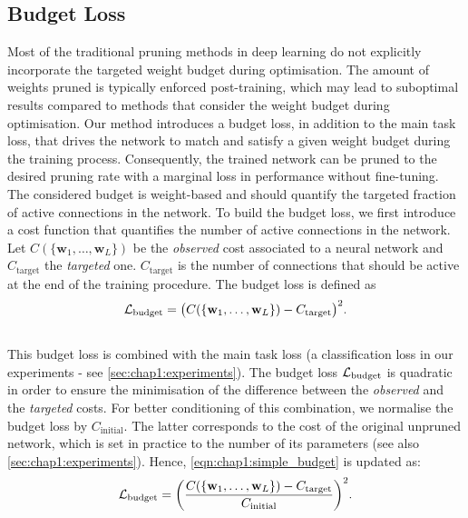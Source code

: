 \subsection{Budget Loss}
\label{sec:chap1:budget_loss}
Most of the traditional pruning methods in deep learning do not explicitly
incorporate the targeted weight budget during optimisation. The amount of
weights pruned is typically enforced post-training, which may lead to suboptimal
results compared to methods that consider the weight budget during optimisation.
Our method introduces a budget loss, in addition to the main task loss, that
drives the network to match and satisfy a given weight budget during the
training process. Consequently, the trained network can be pruned to the desired
pruning rate with a marginal loss in performance without fine-tuning.\\


The considered budget is weight-based and should quantify the targeted fraction
of active connections in the network. To build the budget loss, we first
introduce a cost function that quantifies the number of active connections in
the network. Let $C(\{\mathbf{w}_1,\dots, \mathbf{w}_L\})$ be the {\em observed}
cost associated to a neural network and $C_\text{target}$ the {\em targeted}
one. $C_\text{target}$ is the number of connections that should be active at the
end of the training procedure. The budget loss is defined as \\

\begin{equation}
  \label{eqn:chap1:simple_budget}
  {\cal L}_\text{budget} = \bigl( C(\{\mathbf{w}_1,\dots, \mathbf{w}_L\}) - C_\text{target} \bigr)^2.
\end{equation} \\


\noindent This budget loss is combined with the main task loss (a classification
loss in our experiments - see \cref{sec:chap1:experiments}). The budget loss $
  {\cal L}_\text{budget}$ is quadratic in order to ensure the minimisation of the
difference between the {\em observed} and the {\em targeted} costs. For better
conditioning of this combination, we normalise the budget loss by
$C_\text{initial}$. The latter corresponds to the cost of the original unpruned
network, which is set in practice to the number of its parameters (see also
\cref{sec:chap1:experiments}). Hence, \cref{eqn:chap1:simple_budget} is updated
as:\\

\begin{equation}
  \label{eqn:chap1:real_budget}
  {\cal L}_\text{budget} = \biggl( \displaystyle\frac{C(\{\mathbf{w}_1,\dots, \mathbf{w}_L\}) - C_\text{target}}{C_\text{initial}} \biggr)^2.
\end{equation}\\

